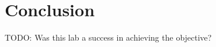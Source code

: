 \documentclass[12pt]{article}
\begin{document}
\section{Conclusion}

TODO: Was this lab a success in achieving the objective?


%
%

\end{document}
